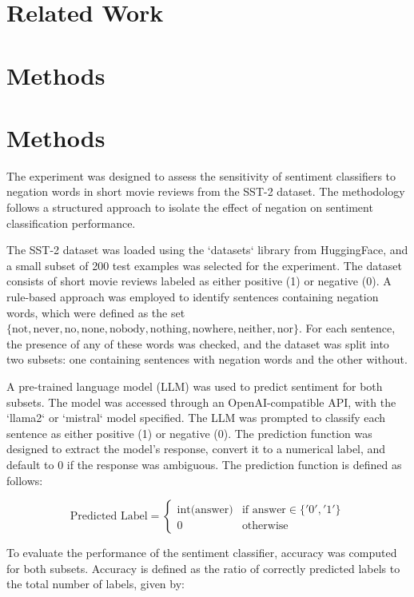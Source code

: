 \documentclass{article}
\begin{document}
\section{Related Work}

\section{Methods}
\section{Methods}

The experiment was designed to assess the sensitivity of sentiment classifiers to negation words in short movie reviews from the SST-2 dataset. The methodology follows a structured approach to isolate the effect of negation on sentiment classification performance.

The SST-2 dataset was loaded using the `datasets` library from HuggingFace, and a small subset of 200 test examples was selected for the experiment. The dataset consists of short movie reviews labeled as either positive (1) or negative (0). A rule-based approach was employed to identify sentences containing negation words, which were defined as the set $\{ \text{not}, \text{never}, \text{no}, \text{none}, \text{nobody}, \text{nothing}, \text{nowhere}, \text{neither}, \text{nor} \}$. For each sentence, the presence of any of these words was checked, and the dataset was split into two subsets: one containing sentences with negation words and the other without.

A pre-trained language model (LLM) was used to predict sentiment for both subsets. The model was accessed through an OpenAI-compatible API, with the `llama2` or `mistral` model specified. The LLM was prompted to classify each sentence as either positive (1) or negative (0). The prediction function was designed to extract the model's response, convert it to a numerical label, and default to 0 if the response was ambiguous. The prediction function is defined as follows:

$$
\text{Predicted Label} = 
\begin{cases} 
\text{int(answer)} & \text{if } \text{answer} \in \{ '0', '1' \} \\
0 & \text{otherwise}
\end{cases}
$$

To evaluate the performance of the sentiment classifier, accuracy was computed for both subsets. Accuracy is defined as the ratio of correctly predicted labels to the total number of labels, given by:
\end{document}
